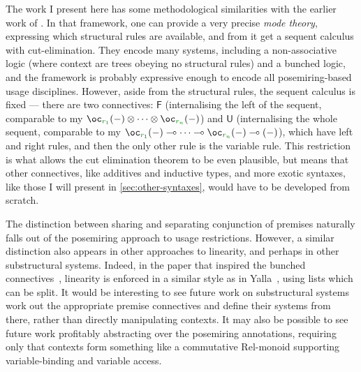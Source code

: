 The work I present here has some methodological similarities with the earlier
work of \citet{LicataSR17}.
In that framework, one can provide a very precise \emph{mode theory}, expressing
which structural rules are available, and from it get a sequent calculus with
cut-elimination.
They encode many systems, including a non-associative logic (where context are
trees obeying no structural rules) and a bunched logic, and the framework is
probably expressive enough to encode all posemiring-based usage disciplines.
However, aside from the structural rules, the sequent calculus is fixed ---
there are two connectives: $\mathsf F$ (internalising the left of the sequent,
comparable to my
$\oc_{\gr{r_1}}\plr{-} \otimes \cdots \otimes \oc_{\gr{r_n}}\plr{-}$) and
$\mathsf U$ (internalising the whole sequent, comparable to my
$\oc_{\gr{r_1}}\plr{-} \multimap \cdots \multimap \oc_{\gr{r_n}}\plr{-}
\multimap \plr{-}$), which have left and right rules, and then the only other
rule is the variable rule.
This restriction is what allows the cut elimination theorem to be even
plausible, but means that other connectives, like additives and inductive types,
and more exotic syntaxes, like those I will present in
\cref{sec:other-syntaxes}, would have to be developed from scratch.

The distinction between sharing and separating conjunction of premises naturally
falls out of the posemiring approach to usage restrictions.
However, a similar distinction also appears in other approaches to linearity,
and perhaps in other substructural systems.
Indeed, in the paper that inspired the bunched connectives~\citep{RPKV20},
linearity is enforced in a similar style as in Yalla~\citep{laurent18}, using
lists which can be split.
It would be interesting to see future work on substructural systems work out the
appropriate premise connectives and define their systems from there, rather than
directly manipulating contexts.
It may also be possible to see future work profitably abstracting over the
posemiring annotations, requiring only that contexts form something like a
commutative $\mathrm{Rel}$-monoid supporting variable-binding and
variable access.
